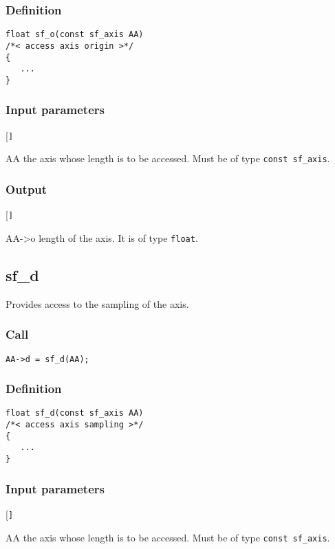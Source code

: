 \subsubsection*{Definition}
\begin{verbatim}  
float sf_o(const sf_axis AA) 
/*< access axis origin >*/
{
   ...
}
\end{verbatim}

\subsubsection{Input parameters}
\begin{desclist}{\tt }{\quad}[\tt ]
   \setlength\itemsep{0pt}
   \item[AA] the axis whose length is to be accessed. Must be of type \texttt{const sf\_axis}.  
\end{desclist}

\subsubsection*{Output}
\begin{desclist}{\tt }{\quad}[\tt ]
   \setlength\itemsep{0pt}  
   \item[AA->o] length of the axis. It is of type \texttt{float}.
\end{desclist}




\subsection{{sf\_d}}\label{sec:sf_d}
Provides access to the sampling of the axis.

\subsubsection*{Call}
\begin{verbatim}AA->d = sf_d(AA);\end{verbatim}

\subsubsection*{Definition}
\begin{verbatim}  
float sf_d(const sf_axis AA) 
/*< access axis sampling >*/
{
   ...
}
\end{verbatim}

\subsubsection{Input parameters}
\begin{desclist}{\tt }{\quad}[\tt ]
   \setlength\itemsep{0pt}
   \item[AA] the axis whose length is to be accessed. Must be of type \texttt{const sf\_axis}.  
\end{desclist}

